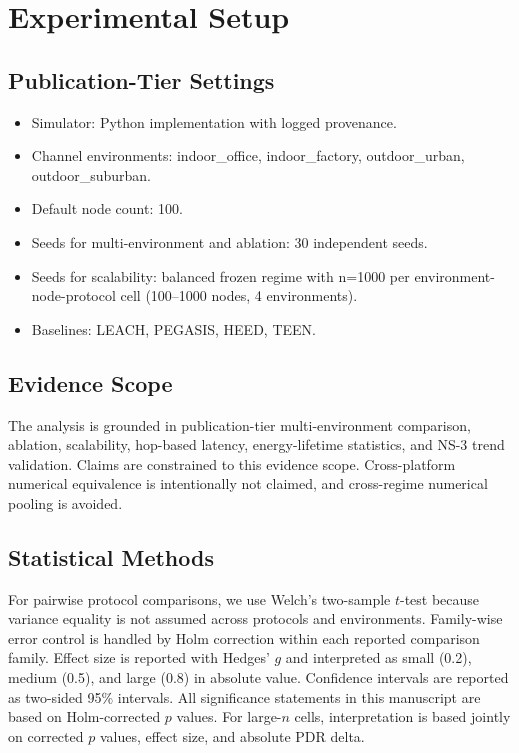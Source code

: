 \documentclass[sensors,article,submit,moreauthors,pdftex]{Definitions/mdpi}
\begin{document}
\section{Experimental Setup}
\subsection{Publication-Tier Settings}
\begin{itemize}
\item Simulator: Python implementation with logged provenance.
\item Channel environments: indoor\_office, indoor\_factory, outdoor\_urban, outdoor\_suburban.
\item Default node count: 100.
\item Seeds for multi-environment and ablation: 30 independent seeds.
\item Seeds for scalability: balanced frozen regime with n=1000 per environment-node-protocol cell (100--1000 nodes, 4 environments).
\item Baselines: LEACH, PEGASIS, HEED, TEEN.
\end{itemize}

\subsection{Evidence Scope}
The analysis is grounded in publication-tier multi-environment comparison, ablation, scalability, hop-based latency, energy-lifetime statistics, and NS-3 trend validation. Claims are constrained to this evidence scope. Cross-platform numerical equivalence is intentionally not claimed, and cross-regime numerical pooling is avoided.

\subsection{Statistical Methods}
For pairwise protocol comparisons, we use Welch's two-sample $t$-test because variance equality is not assumed across protocols and environments. Family-wise error control is handled by Holm correction within each reported comparison family. Effect size is reported with Hedges' $g$ and interpreted as small (0.2), medium (0.5), and large (0.8) in absolute value. Confidence intervals are reported as two-sided 95\% intervals. All significance statements in this manuscript are based on Holm-corrected $p$ values. For large-$n$ cells, interpretation is based jointly on corrected $p$ values, effect size, and absolute PDR delta.
\end{document}
